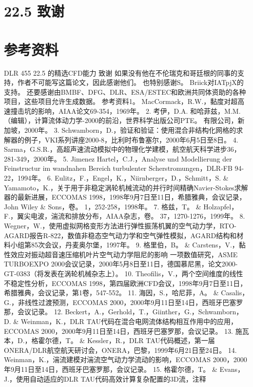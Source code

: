 \documentclass[UTF8,11pt,a4paper,openany,fontset=fandol]{ctexbook}
\begin{document}
\section{22.5 致谢}
\section{参考资料}
DLR 455 22.5 的精选CFD能力 致谢 如果没有他在不伦瑞克和哥廷根的同事的支持，作者不可能写这篇论文，因此感谢他们。 也特别感谢S。 Briick对IATpjX的支持。 还要感谢由BMBF、DFG、DLR、ESA/ESTEC和欧洲共同体资助的各种项目，这些项目允许生成数据。 参考资料1。 MacCormack，R.W.，黏度对超高速撞击坑的影响，AIAA论文69-354，1969年。 2. 考伊，D.A. 和哈菲兹，M.M. （编辑），计算流体动力学-2000的前沿，世界科学出版公司PTE。 有限公司，新加坡，2000年。 3. Schwamborn，D.，验证和验证：使用混合非结构化网格的求解器的例子，VKI系列讲座2000-8，比利时布鲁塞尔，2000年6月5日至8日。 4. Sarma，G.S.R.，高超声速流动模拟中的物理化学建模，航空航天科学进步36，281-349，2000年。 5. Jimenez Hartel，C.J.，Analyse und Modellierung der Feinstructur im wandnahen Bereich turbulenter Scherstromungen，DLR-FB 94-22，1994年。 6. Eulitz，F.，Engel，K.，Niirnberger，D.，Schmitt，S. \& Yamamoto，K.，关于用于非稳定涡轮机械流动的并行时间精确Navier-Stokes求解器的最新进展，ECCOMAS 1998，1998年9月7日至11日，希腊雅典，会议记录，John Wiley \& Sons，卷。 1，252-258，1998年。 7. 格兹，T。 \& Holzapfel，F.，翼尖电波，湍流和排放分布，AIAA杂志，卷。 37，1270-1276，1999年。 8. Wegner，W.，使用虚拟网格变形方法进行弹性振荡机翼的空气动力学，RTO-AGARD报告R-822，数值非稳态空气动力学和空气弹性模拟，AGARD结构和材料小组第85次会议，丹麦奥尔堡，1997年。 9. 格里伯，B。 \& Carstens，V.，黏性效应对振动超音速压缩机叶片空气动力学阻尼的影响 一项数值研究，ASME TURBOEXPO 2000会议记录，2000年5月8日至11日，德国慕尼黑，论文2000-GT-0383（将发表在涡轮机械杂志上）。 10. Theofilis，V.，两个空间维度的线性不稳定性分析，ECCOMAS 1998，第四届欧洲CFD会议，1998年9月7日至11日，希腊雅典，会议记录，第1卷，547-552。 11. 海因，S.，哈尼菲，A。 \& Casalis，G.，非线性过渡预测，ECCOMAS 2000，2000年9月11日至14日，西班牙巴塞罗那，会议记录。 12. Beckert，A.，Gerhold，T.，Giinther，G.，Schwamborn，D. \& Weinman，K.，DLR TAU代码在混合电网流体结构相互作用中的应用，ECCOMAS 2000，2000年9月11日至14日，西班牙巴塞罗那，会议记录。 13. 施瓦本，D.，格霍尔德，T。 \& Kessler，R.，DLR TAU代码概述，第一届ONERA/DLR航空航天研讨会，ONERA，巴黎，1999年6月21日至24日。 14. Weinman，K.，湍流建模对湍流空气动力学流动的影响，ECCOMAS 2000，2000年9月11日至14日，西班牙巴塞罗那，会议记录。 15. 格霍尔德，T。 \& Evans，J.，使用自动适应的DLR TAU代码高效计算复杂配置的3D流，注释
\end{document}
